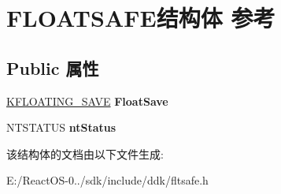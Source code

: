 \hypertarget{struct_f_l_o_a_t_s_a_f_e}{}\section{F\+L\+O\+A\+T\+S\+A\+F\+E结构体 参考}
\label{struct_f_l_o_a_t_s_a_f_e}
\subsection*{Public 属性}
\begin{DoxyCompactItemize}
\item 
\mbox{\label{struct_f_l_o_a_t_s_a_f_e_a8c767fb665b9e338772f111f2e7baa07}} 
\hyperlink{struct___k_f_l_o_a_t_i_n_g___s_a_v_e}{K\+F\+L\+O\+A\+T\+I\+N\+G\+\_\+\+S\+A\+VE} {\bfseries Float\+Save}
\item 
\mbox{\label{struct_f_l_o_a_t_s_a_f_e_a52374ddbd4f4c85bb6f6151b820453b5}} 
N\+T\+S\+T\+A\+T\+US {\bfseries nt\+Status}
\end{DoxyCompactItemize}


该结构体的文档由以下文件生成\+:\begin{DoxyCompactItemize}
\item 
E\+:/\+React\+O\+S-\/0../sdk/include/ddk/fltsafe.\+h\end{DoxyCompactItemize}
